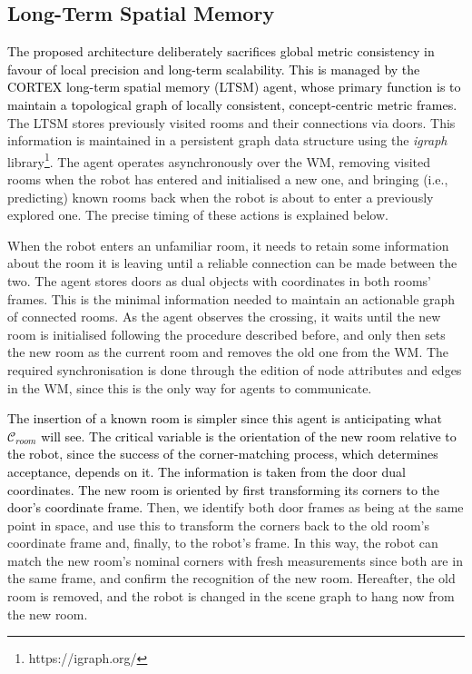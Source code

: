 \documentclass[10pt,a4paper]{article}
\begin{document}
\subsection{Long-Term Spatial Memory}

\textcolor{black}{The proposed architecture deliberately sacrifices global metric consistency in favour of local precision and long-term scalability. This is managed by the CORTEX long-term spatial memory (LTSM) agent, whose primary function is to maintain a topological graph of locally consistent, concept-centric metric frames.} The LTSM stores previously visited rooms and their connections via doors. This information is maintained in a persistent graph data structure using the \textit{igraph} library\footnote{https://igraph.org/}. The agent operates asynchronously over the WM, removing visited rooms when the robot has entered and initialised a new one, and bringing (i.e., predicting) known rooms back when the robot is about to enter a previously explored one. The precise timing of these actions is explained below.

When the robot enters an unfamiliar room, it needs to retain some information about the room it is leaving until a reliable connection can be made between the two. The agent stores doors as dual objects with coordinates in both rooms' frames. This is the minimal information needed to maintain an actionable graph of connected rooms. As the agent observes the crossing, it waits until the new room is initialised following the procedure described before, and only then sets the new room as the current room and removes the old one from the WM. The required synchronisation is done through the edition of node attributes and edges in the WM, since this is the only way for agents to communicate. 

\textcolor{black}{The insertion of a known room is simpler since this agent is anticipating what $\mathcal{C}_{room}$ will see. The critical variable is the orientation of the new room relative to the robot, since the success of the corner-matching process, which determines acceptance, depends on it. The information is taken from the door dual coordinates. The new room is oriented by first transforming its corners to the door's coordinate frame.} 
Then, we identify both door frames as being at the same point in space, and use this to transform the corners back to the old room's coordinate frame and, finally, to the robot's frame. In this way, the robot can match the new room's nominal corners with fresh measurements since both are in the same frame, and confirm the recognition of the new room. Hereafter, the old room is removed, and the robot is changed in the scene graph to hang now from the new room. 
\end{document}
